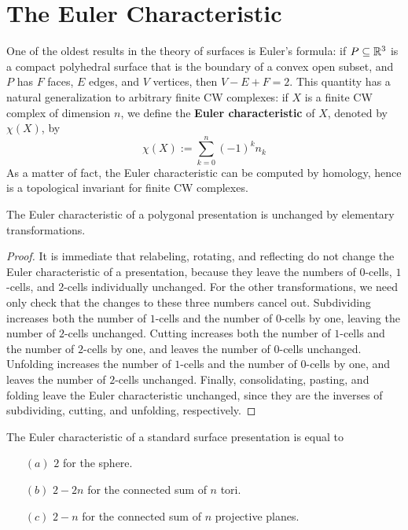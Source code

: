 \section{The Euler Characteristic}
One of the oldest results in the theory of surfaces is Euler's formula: if $P\subseteq\mathbb{R}^3$ is a compact polyhedral surface that is the boundary of a convex open subset, and $P$ has
$F$ faces, $E$ edges, and $V$ vertices, then $V-E+F=2$. This quantity has a natural generalization to arbitrary finite CW complexes: if $X$ is a finite CW complex of
dimension $n$, we define the \textbf{Euler characteristic} of $X$, denoted by $\chi(X)$, by
\[\chi(X):=\sum_{k=0}^{n}(-1)^kn_k\]
As a matter of fact, the Euler characteristic can be computed by homology, hence is a topological invariant for finite CW complexes.
\begin{proposition}
The Euler characteristic of a polygonal presentation is unchanged by elementary transformations.
\end{proposition}
\begin{proof}
It is immediate that relabeling, rotating, and reflecting do not change the Euler characteristic of a presentation, because they leave the numbers of $0$-cells, $1$-cells, and $2$-cells individually unchanged. For the other transformations, we need only check that the changes to these three numbers cancel out. Subdividing increases both the number of $1$-cells and the number of $0$-cells by one, leaving the number of $2$-cells unchanged. Cutting increases both the number of $1$-cells and the number of $2$-cells by one, and leaves the number of $0$-cells unchanged. Unfolding increases the number of $1$-cells and the number of $0$-cells by one, and leaves the number of $2$-cells unchanged. Finally, consolidating, pasting, and folding leave the Euler characteristic unchanged, since they are the inverses of subdividing, cutting, and
unfolding, respectively.
\end{proof}
\begin{proposition}
The Euler characteristic of a standard surface presentation is equal to
\begin{itemize}
\item[$(a)$] $2$ for the sphere.
\item[$(b)$] $2-2n$ for the connected sum of $n$ tori.
\item[$(c)$] $2-n$ for the connected sum of $n$ projective planes.
\end{itemize}
\end{proposition}

